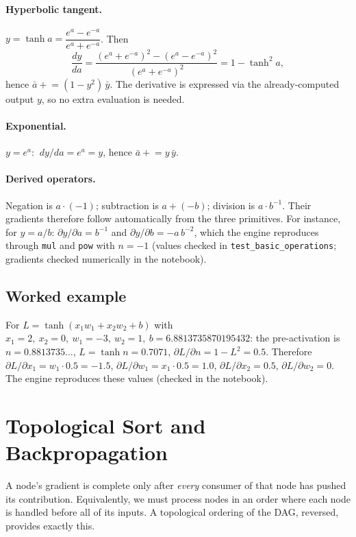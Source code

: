 \documentclass[11pt,a4paper]{article}
\begin{document}
\paragraph{Hyperbolic tangent.} $y=\tanh a = \dfrac{e^{a}-e^{-a}}{e^{a}+e^{-a}}$. Then
\[
\frac{dy}{da}=\frac{(e^a+e^{-a})^2-(e^a-e^{-a})^2}{(e^a+e^{-a})^2}=1-\tanh^2 a,
\]
hence $\bar a \mathrel{+}= (1-y^2)\,\bar y$. The derivative is expressed via the already-computed output $y$, so no extra evaluation is needed.

\paragraph{Exponential.} $y=e^{a}$: $\ dy/da=e^a=y$, hence $\bar a \mathrel{+}= y\,\bar y$.

\paragraph{Derived operators.} Negation is $a\cdot(-1)$; subtraction is $a+(-b)$; division is $a\cdot b^{-1}$. Their gradients therefore follow automatically from the three primitives. For instance, for $y=a/b$: $\partial y/\partial a = b^{-1}$ and $\partial y/\partial b = -a\,b^{-2}$, which the engine reproduces through \texttt{mul} and \texttt{pow} with $n=-1$ (values checked in \texttt{test\_basic\_operations}; gradients checked numerically in the notebook).

\subsection{Worked example}
For $L=\tanh(x_1w_1+x_2w_2+b)$ with $x_1=2,\ x_2=0,\ w_1=-3,\ w_2=1,\ b=6.8813735870195432$: the pre-activation is $n=0.8813735\ldots$, $L=\tanh n=0.7071$, $\partial L/\partial n = 1-L^2 = 0.5$. Therefore $\partial L/\partial x_1 = w_1\cdot0.5=-1.5$, $\partial L/\partial w_1 = x_1\cdot0.5=1.0$, $\partial L/\partial x_2 = 0.5$, $\partial L/\partial w_2=0$. The engine reproduces these values (checked in the notebook).

\section{Topological Sort and Backpropagation}
A node's gradient is complete only after \emph{every} consumer of that node has pushed its contribution. Equivalently, we must process nodes in an order where each node is handled before all of its inputs. A topological ordering of the DAG, reversed, provides exactly this.
\end{document}
